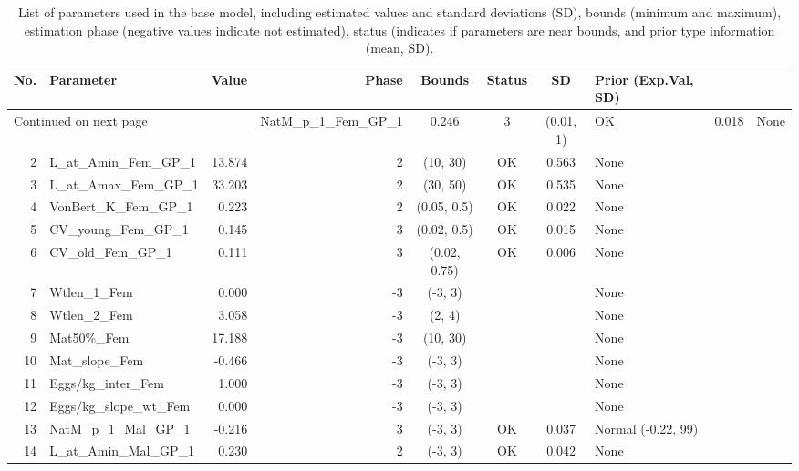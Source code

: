 \documentclass[12pt,]{article}
\begin{document}
\FloatBarrier

\begin{landscape}
\begin{longtable}{rlrrcccl}
\caption{List of parameters used in
                                              the base model, including estimated 
                                              values and standard deviations (SD), 
                                              bounds (minimum and maximum), 
                                              estimation phase (negative values indicate
                                              not estimated), status (indicates if 
                                              parameters are near bounds, and prior type
                                              information (mean, SD).} \\ 
  \hline
No. & Parameter & Value & Phase & Bounds & Status & SD & Prior (Exp.Val, SD)  \\ 
  \hline 
\endhead 
\hline 
\multicolumn{3}{l}{\footnotesize Continued on next page} 
\endfoot 
\endlastfoot 
 \hline
1 & NatM\_p\_1\_Fem\_GP\_1 & 0.246 & 3 & (0.01, 1) & OK & 0.018 & None \\ 
  2 & L\_at\_Amin\_Fem\_GP\_1 & 13.874 & 2 & (10, 30) & OK & 0.563 & None \\ 
  3 & L\_at\_Amax\_Fem\_GP\_1 & 33.203 & 2 & (30, 50) & OK & 0.535 & None \\ 
  4 & VonBert\_K\_Fem\_GP\_1 & 0.223 & 2 & (0.05, 0.5) & OK & 0.022 & None \\ 
  5 & CV\_young\_Fem\_GP\_1 & 0.145 & 3 & (0.02, 0.5) & OK & 0.015 & None \\ 
  6 & CV\_old\_Fem\_GP\_1 & 0.111 & 3 & (0.02, 0.75) & OK & 0.006 & None \\ 
  7 & Wtlen\_1\_Fem & 0.000 & -3 & (-3, 3) &  &  & None \\ 
  8 & Wtlen\_2\_Fem & 3.058 & -3 & (2, 4) &  &  & None \\ 
  9 & Mat50\%\_Fem & 17.188 & -3 & (10, 30) &  &  & None \\ 
  10 & Mat\_slope\_Fem & -0.466 & -3 & (-3, 3) &  &  & None \\ 
  11 & Eggs/kg\_inter\_Fem & 1.000 & -3 & (-3, 3) &  &  & None \\ 
  12 & Eggs/kg\_slope\_wt\_Fem & 0.000 & -3 & (-3, 3) &  &  & None \\ 
  13 & NatM\_p\_1\_Mal\_GP\_1 & -0.216 & 3 & (-3, 3) & OK & 0.037 & Normal (-0.22, 99) \\ 
  14 & L\_at\_Amin\_Mal\_GP\_1 & 0.230 & 2 & (-3, 3) & OK & 0.042 & None \\ 

\end{longtable}
\end{landscape}
\end{document}
